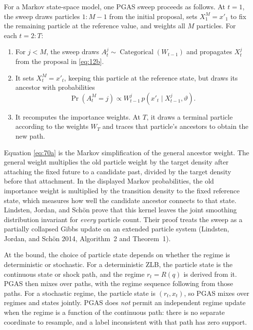 \documentclass[11pt]{article}
\begin{document}
For a Markov state-space model, one PGAS sweep proceeds as follows. At $t=1$, the sweep draws particles $1{:}M-1$ from the initial proposal, sets $X_1^M=x'_1$ to fix the remaining particle at the reference value, and weights all $M$ particles. For each $t=2{:}T$:
\begin{enumerate}
\item For $j<M$, the sweep draws $A_t^j\sim\operatorname{Categorical}(W_{t-1})$ and propagates $X_t^j$ from the proposal in \eqref{eq:12b}.
\item It sets $X_t^M=x'_t$, keeping this particle at the reference state, but draws its ancestor with probabilities
\begin{equation}\label{eq:70a}
 \Pr(A_t^M=j)\propto W_{t-1}^j\,
 p(x'_t\mid X_{t-1}^j,\vartheta).
\end{equation}
\item It recomputes the importance weights. At $T$, it draws a terminal particle according to the weights $W_T$ and traces that particle's ancestors to obtain the new path.
\end{enumerate}
Equation \eqref{eq:70a} is the Markov simplification of the general ancestor weight. The general weight multiplies the old particle weight by the target density after attaching the fixed future to a candidate past, divided by the target density before that attachment. In the displayed Markov probabilities, the old importance weight is multiplied by the transition density to the fixed reference state, which measures how well the candidate ancestor connects to that state. Lindsten, Jordan, and Sch\"on prove that this kernel leaves the joint smoothing distribution invariant for \emph{every} particle count. Their proof treats the sweep as a partially collapsed Gibbs update on an extended particle system (Lindsten, Jordan, and Sch\"on 2014, Algorithm~2 and Theorem~1).

At the bound, the choice of particle state depends on whether the regime is deterministic or stochastic. For a deterministic ZLB, the particle state is the continuous state or shock path, and the regime $r_t=R(q)$ is derived from it. PGAS then mixes over paths, with the regime sequence following from those paths. For a stochastic regime, the particle state is $(r_t,x_t)$, so PGAS mixes over regimes and states jointly. PGAS does \emph{not} permit an independent regime update when the regime is a function of the continuous path: there is no separate coordinate to resample, and a label inconsistent with that path has zero support.
\end{document}
